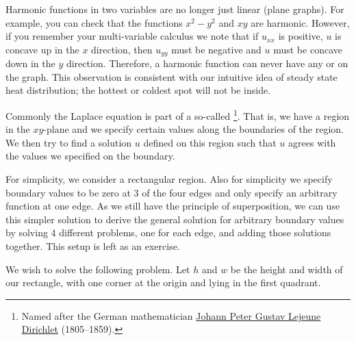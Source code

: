 \documentclass[12pt]{book}
\begin{document}
Harmonic functions in two variables are no longer just linear (plane
graphs).  For example, you can check that the functions
$x^2-y^2$ and $xy$ are harmonic.  However, if you remember your
multi-variable calculus we note that if $u_{xx}$ is positive, $u$ is concave
up in the $x$ direction, then $u_{yy}$ must be negative and $u$ must be
concave down in the $y$ direction.  Therefore, a harmonic function can never
have any  or  on the graph.  This observation is
consistent with our intuitive idea of steady state heat distribution;
the hottest or coldest spot will not be inside.

Commonly the Laplace equation is part of a so-called
\emph{}%
\footnote{Named after the German mathematician
\href{http://en.wikipedia.org/wiki/Dirichlet}{Johann Peter Gustav Lejeune Dirichlet}
(1805--1859).}.
That
is, we have a region in the $xy$-plane and we specify certain values along
the boundaries of the region.  We then try to find a solution $u$ defined on
this region such that $u$ agrees with the values we specified on the
boundary.

For simplicity, we consider a rectangular region.  Also for simplicity
we specify boundary values to be zero at 3 of the four edges and only
specify an arbitrary function at one edge.  As we still have the
principle of superposition, we can use this simpler
solution to derive the general
solution for arbitrary boundary values by solving 4 different problems,
one for each edge, and adding those solutions together.
This setup is left as an exercise.

We wish to solve the following problem.  Let $h$ and $w$
be the height and width of our rectangle, with one corner at the origin and
lying in the first quadrant.
\end{document}
